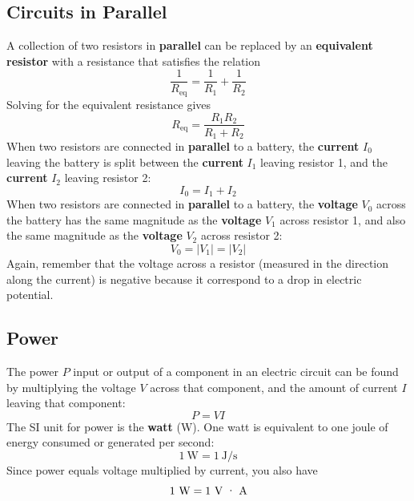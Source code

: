 \subsection{Circuits in Parallel}
%
A collection of two resistors in \textbf{parallel} can be replaced by an \textbf{equivalent resistor} with a resistance that satisfies the relation
\begin{equation}
	\frac{1}{R_{\text{eq}}} = \frac{1}{R_{1}} + \frac{1}{R_{2}}
\end{equation}
Solving for the equivalent resistance gives
\begin{equation} \label{eq.03.RParallel}
	R_{\text{eq}} = \frac{R_{1} R_{2}}{R_{1} + R_{2}}
\end{equation}
When two resistors are connected in \textbf{parallel} to a battery, the \textbf{current} $I_{0}$ leaving the battery is split between the \textbf{current} $I_{1}$ leaving resistor 1, and the \textbf{current} $I_{2}$ leaving resistor 2:
\begin{equation} \label{eq.03.IParallel}
	I_{0} = I_{1} + I_{2}
\end{equation}
When two resistors are connected in \textbf{parallel} to a battery, the \textbf{voltage} $V_{0}$ across the battery has the same magnitude as the \textbf{voltage} $V_{1}$ across resistor 1, and also the same magnitude as the \textbf{voltage} $V_{2}$ across resistor 2:
\begin{equation} \label{eq.03.VParallel}
	V_{0} = \left| V_{1} \right| = \left| V_{2} \right|
\end{equation}
Again, remember that the voltage across a resistor (measured in the direction along the current) is negative because it correspond to a drop in electric potential.
%
\subsection{Power}
%
The power $P$ input or output of a component in an electric circuit can be found by multiplying the voltage $V$ across that component, and the amount of current $I$ leaving that component:
\begin{equation}
	P = VI
\end{equation}
The SI unit for power is the \textbf{watt} (W). One watt is equivalent to one joule of energy consumed or generated per second:
\begin{equation}
	1 \ \text{W} = 1 \ \text{J/s}
\end{equation}
Since power equals voltage multiplied by current, you also have
\begin{equation}
	1 \ \text{W} = 1 \ \text{V {\textperiodcentered} A}
\end{equation}
%
